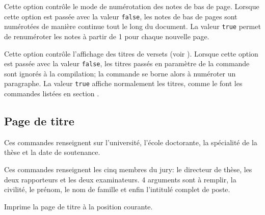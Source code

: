 \documentclass{ltxdockit}
\begin{document}
\begin{optionlist}


Cette option contrôle le mode de numérotation des notes de bas de page. Lorsque cette option est passée avec la valeur \texttt{false}, les notes de bas de pages sont numérotées de manière continue tout le long du document. La valeur \texttt{true} permet de renuméroter les notes à partir de 1 pour chaque nouvelle page.


Cette option contrôle l'affichage des titres de versets (voir ). Lorsque cette option est passée avec la valeur \texttt{false}, les titres passés en paramètre de la commande  sont ignorés à la compilation; la commande  se borne alors à numéroter un paragraphe. La valeur \texttt{true} affiche normalement les titres, comme le font les commandes listées en section .


\end{optionlist}

\subsection{Page de titre}

\begin{ltxsyntax}


Ces commandes renseignent sur l'université, l'école doctorante, la spécialité de la thèse et la date de soutenance.


Ces commandes renseignent les cinq membres du jury: le directeur de thèse, les deux rapporteurs et les deux examinateurs. 4 arguments sont à remplir, la civilité, le prénom, le nom de famille et enfin l'intitulé complet de poste.


Imprime la page de titre à la position courante.

\end{ltxsyntax}
\end{document}
